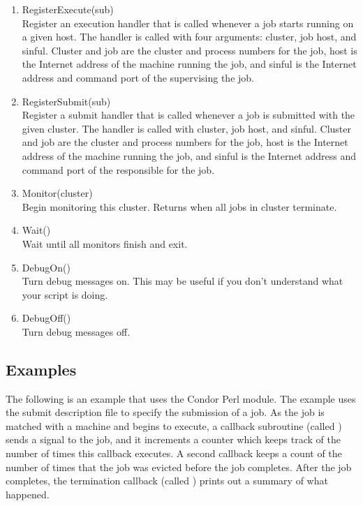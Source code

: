 \begin{enumerate}
	\item RegisterExecute(sub) \\
	Register an execution handler that is called whenever a job starts
	running on a given host.  The handler is called with four arguments:
	cluster, job  host, and sinful.  Cluster and job are the cluster and
	process numbers for the job, host is the Internet address of the
	machine running the job, and sinful is the Internet address and 
	command port of the  supervising the job.

	\item RegisterSubmit(sub) \\
	Register a submit handler that is called whenever a job is submitted
	with the given cluster.  The handler is called with cluster, job 
	host, and sinful. Cluster and job are the cluster and
	process numbers for the job, host is the Internet address of the
	machine running the job, and sinful is the Internet address and
	command port of the  responsible for the job.

	\item Monitor(cluster) \\
	Begin monitoring this cluster. Returns when all jobs in cluster
	terminate.  \\
	
	\item Wait() \\
	Wait until all monitors finish and exit.

	\item DebugOn() \\
	Turn debug messages on.  This may be useful if you don't understand
	what your script is doing.	

	\item DebugOff() \\
	Turn debug messages off.

\end{enumerate}


\subsection{Examples}

The following is an example that uses the Condor Perl module.
The example uses the submit description file 
 to specify the submission of a job.
As the job is matched with a machine and begins to execute,
a callback  subroutine (called \verb@execute@)
sends a  signal to the job,
and it increments a counter which keeps track of the
number of times this callback executes.
A second callback keeps a count of the number of times
that the job was evicted before the job completes.
After the job completes, the termination
callback (called \verb@normal@) prints out a summary of what happened.


